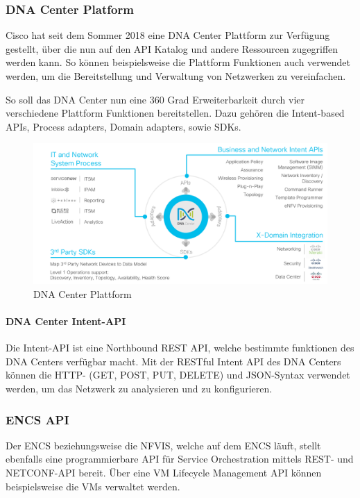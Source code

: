 \subsubsection{DNA Center Platform}
Cisco hat seit dem Sommer 2018 eine DNA Center Plattform zur Verfügung gestellt, über die nun auf den API Katalog und andere Ressourcen zugegriffen werden kann. So können beispielsweise die Plattform Funktionen auch verwendet werden, um die Bereitstellung und Verwaltung von Netzwerken zu vereinfachen.


So soll das DNA Center nun eine 360 Grad Erweiterbarkeit durch vier verschiedene Plattform Funktionen bereitstellen. Dazu gehören die Intent-based APIs, Process adapters, Domain adapters, sowie SDKs. \cite{dnac-platform}

\begin{figure}[H]
	\centering
	\includegraphics[width=0.8\linewidth]{img/Abstrahierung/dnac-platform}
	\caption{DNA Center Plattform \cite{dnac-platform}}
	\label{fig:DNA Center Plattform}
\end{figure}


\paragraph{DNA Center Intent-API}

Die Intent-API ist eine Northbound REST API, welche bestimmte funktionen des DNA Centers verfügbar macht. Mit der RESTful Intent API des DNA Centers können die HTTP- (GET, POST, PUT, DELETE) und JSON-Syntax verwendet werden, um das Netzwerk zu analysieren und zu konfigurieren. \cite{dnac-platform}

\subsubsection{ENCS API}
Der ENCS beziehungsweise die NFVIS, welche auf dem ENCS läuft, stellt ebenfalls eine programmierbare API für Service Orchestration mittels REST- und NETCONF-API bereit. Über eine VM Lifecycle Management API können beispielsweise die VMs verwaltet werden.